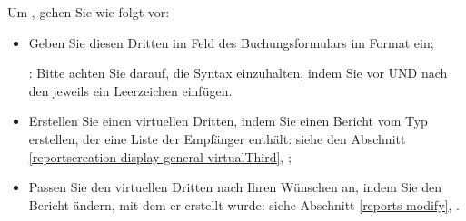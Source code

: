 Um , gehen Sie wie folgt vor:
\begin{itemize}
	\item Geben Sie diesen Dritten im Feld  des Buchungsformulars im Format  ein;
	
	\Note{}: Bitte achten Sie darauf, die Syntax einzuhalten, indem Sie vor UND nach den \dequote{:} jeweils ein Leerzeichen einfügen.
	\item Erstellen Sie einen virtuellen Dritten, indem Sie einen Bericht vom Typ  erstellen, der eine Liste der Empfänger enthält: siehe den Abschnitt \vref{reportscreation-display-general-virtualThird}, ;
	\item Passen Sie den virtuellen Dritten nach Ihren Wünschen an, indem Sie den Bericht ändern, mit dem er erstellt wurde: siehe Abschnitt \vref{reports-modify}, .
\end{itemize}

